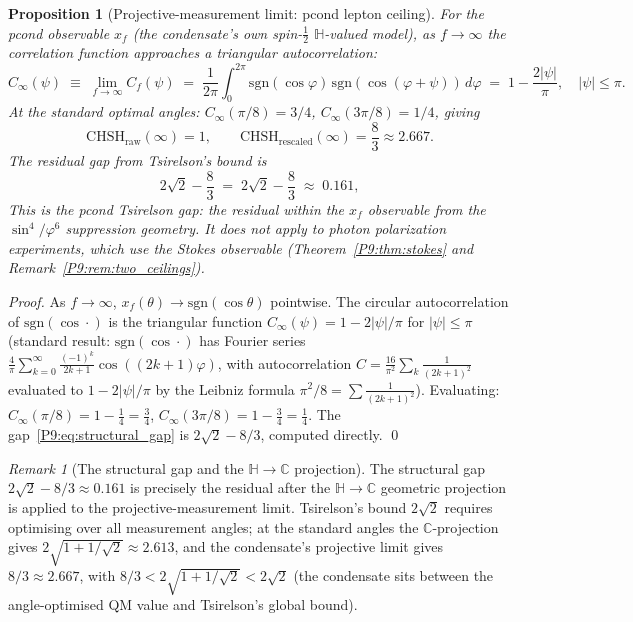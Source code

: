 \documentclass[11pt,a4paper]{article}
\newtheorem{proposition}[theorem]{Proposition}
\theoremstyle{definition}
\theoremstyle{remark}
\newtheorem{remark}[theorem]{Remark}
\newcommand{\vp}{\varphi}
\newcommand{\CC}{\mathbb{C}}
\newcommand{\HH}{\mathbb{H}}
\newcommand{\CHSH}{\mathrm{CHSH}}
\newcommand{\Tsirelson}{2\sqrt{2}}
\begin{document}
\begin{proposition}[Projective-measurement limit: pcond lepton ceiling]
\label{P9:prop:projective}
For the pcond observable $x_f$ (the condensate's own spin-$\tfrac{1}{2}$
$\HH$-valued model), as $f\to\infty$ the correlation function approaches
a triangular autocorrelation:
\begin{equation}
  C_\infty(\psi) \;\equiv\; \lim_{f\to\infty} C_f(\psi)
  \;=\; \frac{1}{2\pi}\int_0^{2\pi}
  \mathrm{sgn}(\cos\varphi)\,\mathrm{sgn}(\cos(\varphi+\psi))\,d\varphi
  \;=\; 1 - \frac{2|\psi|}{\pi},
  \quad |\psi|\leq\pi.
\end{equation}
At the standard optimal angles:
$C_\infty(\pi/8)=3/4$, $C_\infty(3\pi/8)=1/4$, giving
\begin{equation}
  \CHSH_\mathrm{raw}(\infty) = 1,
  \qquad
  \CHSH_\mathrm{rescaled}(\infty) = \frac{8}{3} \approx 2.667.
  \label{P9:eq:chsh_projective}
\end{equation}
The residual gap from Tsirelson's bound is
\begin{equation}
  \boxed{\Tsirelson - \frac{8}{3}
  \;=\; 2\sqrt{2} - \frac{8}{3}
  \;\approx\; 0.161},
  \label{P9:eq:structural_gap}
\end{equation}
This is the \emph{pcond Tsirelson gap}: the residual within the
$x_f$ observable from the $\sin^4/\vp^6$ suppression geometry.
It does \emph{not} apply to photon polarization experiments,
which use the Stokes observable
(Theorem~\ref{P9:thm:stokes} and Remark~\ref{P9:rem:two_ceilings}).
\end{proposition}
 
\begin{proof}
As $f\to\infty$, $x_f(\theta)\to\mathrm{sgn}(\cos\theta)$ pointwise.
The circular autocorrelation of $\mathrm{sgn}(\cos\cdot)$ is the
triangular function $C_\infty(\psi)=1-2|\psi|/\pi$ for $|\psi|\leq\pi$
(standard result: $\mathrm{sgn}(\cos\cdot)$ has Fourier series
$\tfrac{4}{\pi}\sum_{k=0}^\infty\tfrac{(-1)^k}{2k+1}\cos((2k+1)\varphi)$,
with autocorrelation $C=\tfrac{16}{\pi^2}\sum_k\tfrac{1}{(2k+1)^2}$
evaluated to $1-2|\psi|/\pi$ by the Leibniz formula $\pi^2/8=\sum\tfrac{1}{(2k+1)^2}$).
Evaluating: $C_\infty(\pi/8) = 1-\tfrac{1}{4}=\tfrac{3}{4}$,
$C_\infty(3\pi/8) = 1-\tfrac{3}{4}=\tfrac{1}{4}$.
The gap~\eqref{P9:eq:structural_gap} is $2\sqrt{2}-8/3$, computed directly.
\qed
\end{proof}
 
\begin{remark}[The structural gap and the $\HH\to\CC$ projection]
\label{P9:rem:structural_gap_projection}
The structural gap $2\sqrt{2}-8/3\approx0.161$ is precisely the
residual after the $\HH\to\CC$ geometric projection is applied to
the projective-measurement limit.
Tsirelson's bound $2\sqrt{2}$ requires optimising over all measurement
angles; at the standard angles the $\CC$-projection gives
$2\sqrt{1+1/\sqrt{2}}\approx2.613$, and the condensate's
projective limit gives $8/3\approx2.667$, with
$8/3 < 2\sqrt{1+1/\sqrt{2}} < 2\sqrt{2}$ (the condensate sits
between the angle-optimised QM value and Tsirelson's global bound).
\end{remark}
 
\end{document}
